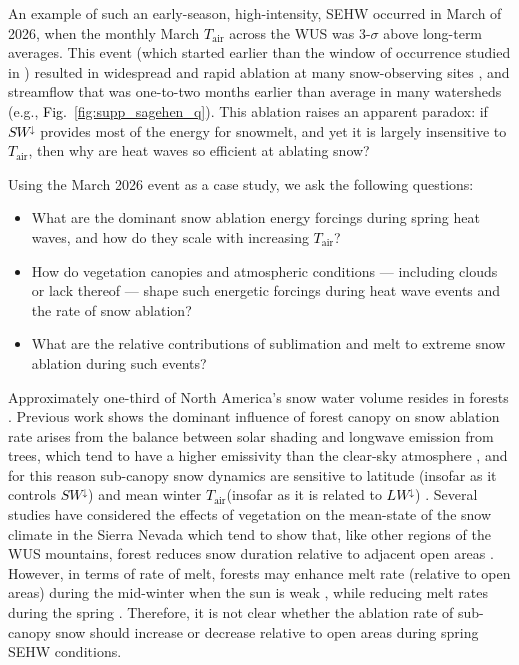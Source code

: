 \documentclass[draft]{agujournal2019}
\newcommand{\fignop}[2]{\textcolor{black}{Fig.~\ref{#1}{#2}}}  %
\newcommand{\todo}[1]{\textcolor{purple}{TODO: #1}}      %
\newcommand{\tair}{\textcolor{black}{$T_{\mathrm{air}}$}\xspace}
\newcommand{\lwdn}{\textcolor{black}{$LW^{\downarrow}$}\xspace}
\newcommand{\swdn}{\textcolor{black}{$SW^{\downarrow}$}\xspace}
\begin{document}
An example of such an early-season, high-intensity, SEHW occurred in March of 2026, when the monthly March \tair across the WUS was 3-$\sigma$ above long-term averages.
This event (which started earlier than the window of occurrence studied in ) resulted in widespread and rapid ablation at many snow-observing sites \cite{Marshall2026-sy}, and streamflow that was one-to-two months earlier than average in many watersheds (e.g., \fignop{fig:supp_sagehen_q}{}).
This ablation raises an apparent paradox: if \swdn provides most of the energy for snowmelt, and yet it is largely insensitive to \tair, then why are heat waves so efficient at ablating snow?


Using the March 2026 event as a case study, we ask the following questions:
\begin{itemize}
  \item What are the dominant snow ablation energy forcings during spring heat waves, and how do they scale with increasing \tair?
  \item How do vegetation canopies and atmospheric conditions --- including clouds or lack thereof --- shape such energetic forcings during heat wave events and the rate of snow ablation?
  \item What are the relative contributions of sublimation and melt to extreme snow ablation during such events?
\end{itemize}

Approximately one-third of North America's snow water volume resides in forests \cite{Kim2021-eu}.
Previous work shows the dominant influence of forest canopy on snow ablation rate arises from the balance between solar shading and longwave emission from trees, which tend to have a higher emissivity than the clear-sky atmosphere \cite{Sicart2004-kf}, and for this reason sub-canopy snow dynamics are sensitive to latitude (insofar as it controls \swdn) and mean winter \tair (insofar as it is related to \lwdn) \cite{Lundquist2013-uc}.  
Several studies have considered the effects of vegetation on the mean-state of the snow climate in the Sierra Nevada \cite{Harpold2020-rc, Krogh2020-dh, Piske2025-qi} which tend to show that, like other regions of the WUS mountains, forest reduces snow duration relative to adjacent open areas \cite{Lundquist2013-uc}.
However, in terms of rate of melt, forests may enhance melt rate (relative to open areas) during the mid-winter when the sun is weak \cite{Bales2011-vs}, while reducing melt rates during the spring \cite{Kittredge1953-iy}.
Therefore, it is not clear whether the ablation rate of sub-canopy snow should increase or decrease relative to open areas during spring SEHW conditions. 
\end{document}
